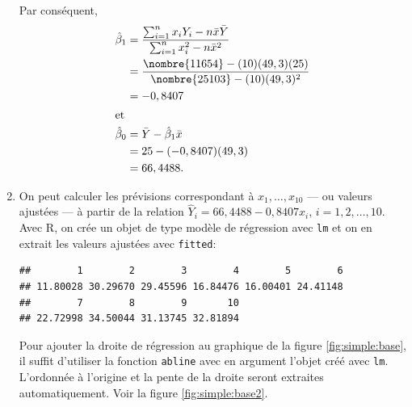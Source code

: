 \begin{solution}{2.1}
\begin{enumerate}
\begin{displaymath}
      \end{displaymath}
      Par conséquent,
      \begin{align*}
        \hat{\beta}_1
        &= \frac{\sum_{i=1}^n x_i Y_i - n \bar{x}\bar{Y}}{\sum_{i=1}^n
          x_i^2 - n \bar{x}^2} \\
        &= \frac{\nombre{11654} - (10)(49,3)(25)}{\nombre{25103} -
          (10)(49,3)^2} \\
        &= -0,8407 \\
        \intertext{et}
        \hat{\beta}_0
        &=\bar{Y}-\hat{\beta}_1\bar{x}\\
        &=25 - (-0,8407)(49,3)\\
        &=66,4488.
      \end{align*}
    \item On peut calculer les prévisions correspondant à $x_1, \dots,
      x_{10}$ --- ou valeurs ajustées --- à partir de la relation
      $\hat{Y}_i = 66,4488 - 0,8407 x_i$, $i = 1, 2, \dots, 10$. Avec
      \textsf{R}, on crée un objet de type modèle de régression avec
      \texttt{lm} et on en extrait les valeurs ajustées avec
      \texttt{fitted}:
\begin{knitrout}
\color{fgcolor}\begin{kframe}
\begin{alltt}
 \hlkwb{<-}  \hlopt{~} 
\end{alltt}
\begin{verbatim}
##        1        2        3        4        5        6
## 11.80028 30.29670 29.45596 16.84476 16.00401 24.41148
##        7        8        9       10
## 22.72998 34.50044 31.13745 32.81894
\end{verbatim}
\end{kframe}
\end{knitrout}
      Pour ajouter la droite de régression au graphique de la figure
      \ref{fig:simple:base}, il suffit d'utiliser la fonction
      \texttt{abline} avec en argument l'objet créé avec
      \texttt{lm}. L'ordonnée à l'origine et la pente de la droite
      seront extraites automatiquement. Voir la figure \ref{fig:simple:base2}.
      \begin{figure}
\begin{knitrout}
\color{fgcolor}\begin{kframe}
\begin{alltt}
\end{alltt}
\end{kframe}
\end{knitrout}
\begin{knitrout}
\color{fgcolor}


\end{knitrout}
\end{figure}
\end{enumerate}
\end{solution}
